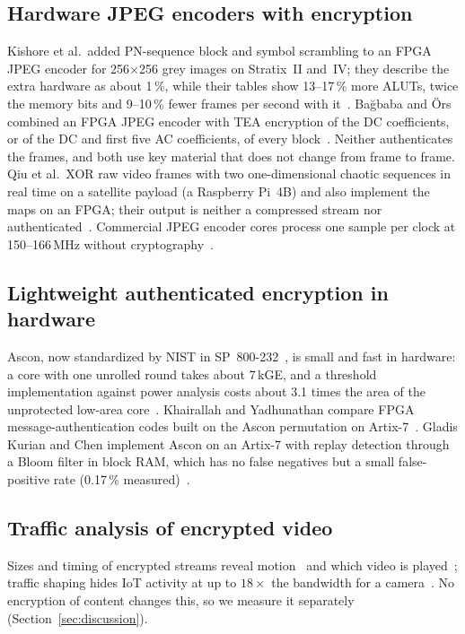 \subsection{Hardware JPEG encoders with encryption}
Kishore et al.\ added PN-sequence block and symbol scrambling to an FPGA JPEG encoder for 256$\times$256 grey images on Stratix~II and~IV; they describe the extra hardware as about 1\,\%, while their tables show 13--17\,\% more ALUTs, twice the memory bits and 9--10\,\% fewer frames per second with it~\cite{kishore2015}. Ba\u{g}baba and \"Ors combined an FPGA JPEG encoder with TEA encryption of the DC coefficients, or of the DC and first five AC coefficients, of every block~\cite{bagbaba2015}. Neither authenticates the frames, and both use key material that does not change from frame to frame. Qiu et al.\ XOR raw video frames with two one-dimensional chaotic sequences in real time on a satellite payload (a Raspberry Pi~4B) and also implement the maps on an FPGA; their output is neither a compressed stream nor authenticated~\cite{qiu2025}. Commercial JPEG encoder cores process one sample per clock at 150--166\,MHz without cryptography~\cite{logijpge,castjpeg}.

\subsection{Lightweight authenticated encryption in hardware}
Ascon, now standardized by NIST in SP~800-232~\cite{sp800232,ascon}, is small and fast in hardware: a core with one unrolled round takes about 7\,kGE, and a threshold implementation against power analysis costs about 3.1 times the area of the unprotected low-area core~\cite{gross2017}. Khairallah and Yadhunathan compare FPGA message-authentication codes built on the Ascon permutation on Artix-7~\cite{khairallah2023}. Gladis Kurian and Chen implement Ascon on an Artix-7 with replay detection through a Bloom filter in block RAM, which has no false negatives but a small false-positive rate (0.17\,\% measured)~\cite{kurian2025}.

\subsection{Traffic analysis of encrypted video}
Sizes and timing of encrypted streams reveal motion~\cite{wampler2015} and which video is played~\cite{schuster2017}; traffic shaping hides IoT activity at up to $18\times$ the bandwidth for a camera~\cite{apthorpe2019}. No encryption of content changes this, so we measure it separately (Section~\ref{sec:discussion}).

